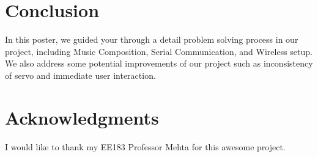 \documentclass[a0,landscape]{a0poster}
\begin{document}
\begin{multicols}{4}

\section*{Conclusion}

\color{SaddleBrown} %
In this poster, we guided your through a detail problem solving process in our project, including Music Composition, Serial Communication, and Wireless setup. We also address some potential improvements of our project such as inconsistency of servo and immediate user interaction.
\color{DarkSlateGray} %


\nocite{*} %


\section*{Acknowledgments}
I would like to thank my EE183 Professor Mehta for this awesome project.

\end{multicols}
\end{document}
